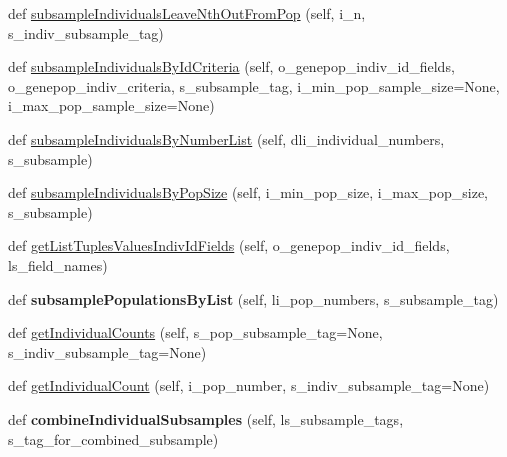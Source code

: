 \begin{DoxyCompactItemize}
\item 
def \hyperlink{classnegui_1_1genepopfilemanager_1_1GenepopFileManager_a4782a6591f4ae8300d92009be038252f}{subsample\+Individuals\+Leave\+Nth\+Out\+From\+Pop} (self, i\+\_\+n, s\+\_\+indiv\+\_\+subsample\+\_\+tag)
\item 
def \hyperlink{classnegui_1_1genepopfilemanager_1_1GenepopFileManager_a361b30c9f9533b8610b3f587dc2677ea}{subsample\+Individuals\+By\+Id\+Criteria} (self, o\+\_\+genepop\+\_\+indiv\+\_\+id\+\_\+fields, o\+\_\+genepop\+\_\+indiv\+\_\+criteria, s\+\_\+subsample\+\_\+tag, i\+\_\+min\+\_\+pop\+\_\+sample\+\_\+size=None, i\+\_\+max\+\_\+pop\+\_\+sample\+\_\+size=None)
\item 
def \hyperlink{classnegui_1_1genepopfilemanager_1_1GenepopFileManager_abc486d49a3634caa7a64cd19cb6ff945}{subsample\+Individuals\+By\+Number\+List} (self, dli\+\_\+individual\+\_\+numbers, s\+\_\+subsample)
\item 
def \hyperlink{classnegui_1_1genepopfilemanager_1_1GenepopFileManager_afdad8528d7b19a8b2eeca447bb95a5a0}{subsample\+Individuals\+By\+Pop\+Size} (self, i\+\_\+min\+\_\+pop\+\_\+size, i\+\_\+max\+\_\+pop\+\_\+size, s\+\_\+subsample)
\item 
def \hyperlink{classnegui_1_1genepopfilemanager_1_1GenepopFileManager_a7e33739c660032e607db1066c4edd1f8}{get\+List\+Tuples\+Values\+Indiv\+Id\+Fields} (self, o\+\_\+genepop\+\_\+indiv\+\_\+id\+\_\+fields, ls\+\_\+field\+\_\+names)
\item 
def {\bfseries subsample\+Populations\+By\+List} (self, li\+\_\+pop\+\_\+numbers, s\+\_\+subsample\+\_\+tag)\hypertarget{classnegui_1_1genepopfilemanager_1_1GenepopFileManager_aab1109500d95ec010b4c39f198bb41c9}{}\label{classnegui_1_1genepopfilemanager_1_1GenepopFileManager_aab1109500d95ec010b4c39f198bb41c9}

\item 
def \hyperlink{classnegui_1_1genepopfilemanager_1_1GenepopFileManager_aca743749002b9828cd66730e42db4387}{get\+Individual\+Counts} (self, s\+\_\+pop\+\_\+subsample\+\_\+tag=None, s\+\_\+indiv\+\_\+subsample\+\_\+tag=None)
\item 
def \hyperlink{classnegui_1_1genepopfilemanager_1_1GenepopFileManager_a05e723069f5129b21a4d017c2a5317b0}{get\+Individual\+Count} (self, i\+\_\+pop\+\_\+number, s\+\_\+indiv\+\_\+subsample\+\_\+tag=None)
\item 
def {\bfseries combine\+Individual\+Subsamples} (self, ls\+\_\+subsample\+\_\+tags, s\+\_\+tag\+\_\+for\+\_\+combined\+\_\+subsample)\hypertarget{classnegui_1_1genepopfilemanager_1_1GenepopFileManager_a3f62c4250a0aa8a9b810424d0f62c068}{}\label{classnegui_1_1genepopfilemanager_1_1GenepopFileManager_a3f62c4250a0aa8a9b810424d0f62c068}


\end{DoxyCompactItemize}
